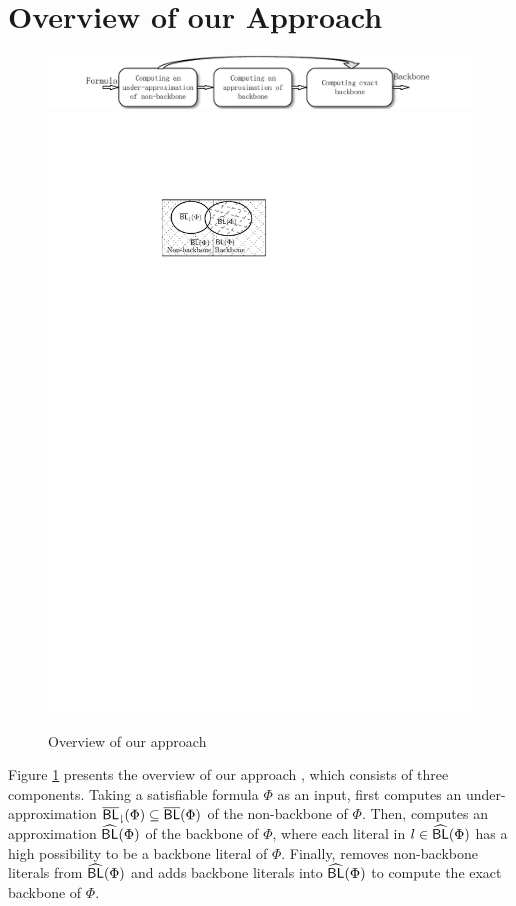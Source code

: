 \section{Overview of our Approach}\label{sec:walg}
\begin{figure}[t]
 \hspace*{-12mm}   \includegraphics[scale=0.8]{Framework}
  \hspace*{-15mm} \includegraphics[scale=0.8]{Fig-backbone}
   \caption{Overview of our approach}
   \label{flow}
\end{figure}

Figure \ref{flow} presents the overview of our approach \tool, which consists of three components. Taking a satisfiable formula
$\Phi$ as an input, \tool first computes an under-approximation ${\sf \overline{BL}_\downharpoonright}(\Phi)\subseteq \overline{\textsf{BL}}(\Phi)$ of the non-backbone of
$\Phi$. Then, \tool computes an approximation ${\sf \widehat{BL}}(\Phi)$ of the backbone of $\Phi$, where each literal in $l\in {\sf \widehat{BL}}(\Phi)$ has a high possibility to be a backbone literal of $\Phi$.
Finally, \tool removes non-backbone literals from ${\sf \widehat{BL}}(\Phi)$ and adds backbone literals into ${\sf \widehat{BL}}(\Phi)$ to compute the exact backbone of $\Phi$.

